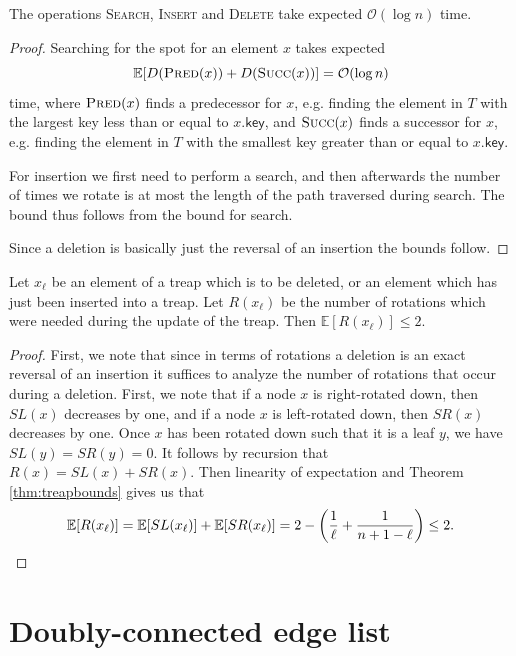 \begin{lem} \label{lem:treapoperationsbounds}
The operations \textsc{Search}, \textsc{Insert} and \textsc{Delete} take expected $\mathcal{O}(\log n)$ time.
\end{lem}
\begin{proof}
Searching for the spot for an element $x$ takes expected
\[
    \mathbb{E}[D(\textsc{Pred}(x)) + D(\textsc{Succ}(x))] = \mathcal{O}(\log n)
\]
time, where $\textsc{Pred}(x)$ finds a predecessor for $x$, e.g. finding the element in $T$ with the largest key less than or equal to $x\textsf{.key}$, and $\textsc{Succ}(x)$ finds a successor for $x$, e.g. finding the element in $T$ with the smallest key greater than or equal to $x\textsf{.key}$.

For insertion we first need to perform a search, and then afterwards the number of times we rotate is at most the length of the path traversed during search. The bound thus follows from the bound for search.

Since a deletion is basically just the reversal of an insertion the bounds follow.
\end{proof}

\begin{lem} \label{lem:treaprotationbound}
Let $x_{\ell}$ be an element of a treap which is to be deleted, or an element which has just been inserted into a treap. Let $R(x_{\ell})$ be the number of rotations which were needed during the update of the treap. Then $\mathbb{E}[R(x_{\ell})] \leq 2$.
\end{lem}
\begin{proof}
First, we note that since in terms of rotations a deletion is an exact reversal of an insertion it suffices to analyze the number of rotations that occur during a deletion. First, we note that if a node $x$ is right-rotated down, then $SL(x)$ decreases by one, and if a node $x$ is left-rotated down, then $SR(x)$ decreases by one. Once $x$ has been rotated down such that it is a leaf $y$, we have $SL(y) = SR(y) = 0$. It follows by recursion that $R(x) = SL(x) + SR(x)$. Then linearity of expectation and Theorem \ref{thm:treapbounds} gives us that
\[
    \mathbb{E}[R(x_{\ell})] = \mathbb{E}[SL(x_{\ell})] + \mathbb{E}[SR(x_{\ell})] = 2 - \left(\frac{1}{\ell} + \frac{1}{n + 1 - \ell}\right) \leq 2.
\]
\end{proof}

\newpage
\section{Doubly-connected edge list}

